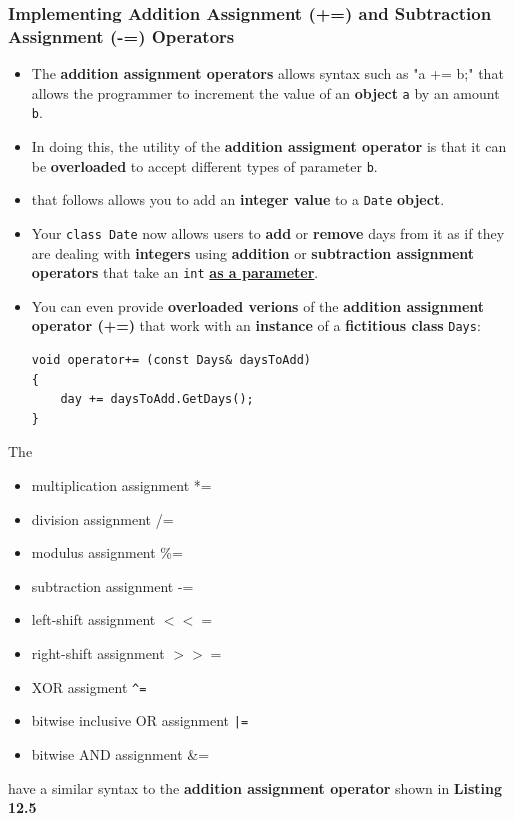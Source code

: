 \documentclass[10pt]{article}
\newcommand{\pbreak}{\vspace{30pt}}
\begin{document}
\subsubsection{Implementing Addition Assignment (+=) and Subtraction Assignment (-=) Operators}
\begin{itemize}
	\item The \textbf{addition assignment operators} allows syntax such as "a += b;" that allows the programmer to increment the value of an \textbf{object} \verb|a| by an amount \verb|b|.

	\item In doing this, the utility of the \textbf{addition assigment operator} is that it can be \textbf{overloaded} to accept different types of parameter \verb|b|.

	\item {} that follows allows you to add an \textbf{integer value} to a \verb|Date| \textbf{object}.

		\pbreak

\item Your \verb|class Date| now allows users to \textbf{add} or \textbf{remove} days from it as if they are dealing with \textbf{integers} using \textbf{addition} or \textbf{subtraction assignment operators} that take an \verb|int| \textbf{\underline{as a parameter}}.

	\item You can even provide \textbf{overloaded verions} of the \textbf{addition assignment operator (+=)} that work with an \textbf{instance} of a \textbf{fictitious class} \verb|Days|:

	\begin{verbatim}
void operator+= (const Days& daysToAdd)
{
	day += daysToAdd.GetDays();
}
	\end{verbatim}
\end{itemize}

\newpage

\begin{tcolorbox}
	The
	\begin{itemize}
		\item multiplication assignment *=
		\item division assignment /=
		\item modulus assignment \%=
		\item subtraction assignment -=
		\item left-shift assignment $<<=$
		\item right-shift assignment $>>=$
		\item XOR assigment \verb|^=|
		\item bitwise inclusive OR assignment \verb+|=+
		\item bitwise AND assignment \&=
	\end{itemize}

	have a similar syntax to the \textbf{addition assignment operator} shown in \textbf{Listing 12.5}
\end{tcolorbox}
\end{document}
